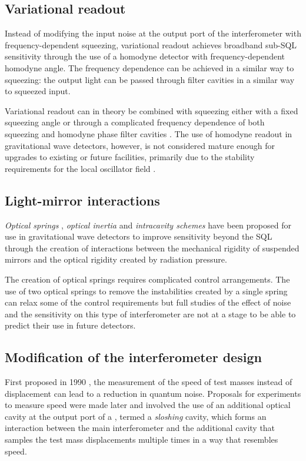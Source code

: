 \subsection{Variational readout}
Instead of modifying the input noise at the output port of the interferometer with frequency-dependent squeezing, variational readout achieves broadband sub-\gls{SQL} sensitivity through the use of a homodyne detector  with frequency-dependent homodyne angle. The frequency dependence can be achieved in a similar way to squeezing: the output light can be passed through filter cavities in a similar way to squeezed input.

Variational readout can in theory be combined with squeezing either with a fixed squeezing angle \cite{Buonanno2004} or through a complicated frequency dependence of both squeezing and homodyne phase filter cavities \cite{Harms2003}. The use of homodyne readout in gravitational wave detectors, however, is not considered mature enough for upgrades to existing or future facilities, primarily due to the stability requirements for the local oscillator field \cite{Steinlechner2015}.

\subsection{Light-mirror interactions}
\emph{Optical springs} \cite{Braginsky1999, Buonanno2002, Corbitt2007, Rehbein2008, Gordon2015}, \emph{optical inertia} \cite{Khalili2011, Voronchev2012} and \emph{intracavity schemes} \cite{Braginsky1997, Khalili2002, Danilishin2006} have been proposed for use in gravitational wave detectors to improve sensitivity beyond the \gls{SQL} through the creation of interactions between the mechanical rigidity of suspended mirrors and the optical rigidity created by radiation pressure.

The creation of optical springs requires complicated control arrangements. The use of two optical springs to remove the instabilities created by a single spring can relax some of the control requirements but full studies of the effect of noise and the sensitivity on this type of interferometer are not at a stage to be able to predict their use in future detectors.

\subsection{Modification of the interferometer design}
First proposed in 1990 \cite{Braginsky1990}, the measurement of the speed of test masses instead of displacement can lead to a reduction in quantum noise. Proposals for experiments to measure speed were made later and involved the use of an additional optical cavity at the output port of a \MI{} \cite{Braginsky2000, Purdue2002}, termed a \emph{sloshing} cavity, which forms an interaction between the main interferometer and the additional cavity that samples the test mass displacements multiple times in a way that resembles speed.

